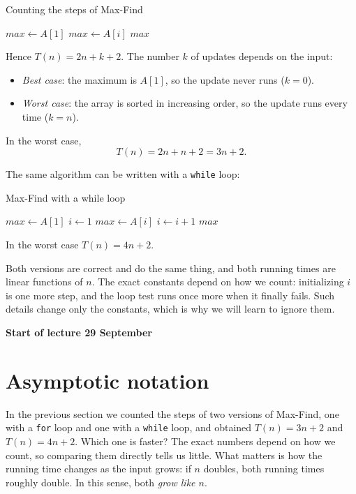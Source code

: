 \documentclass[a4paper,12pt,oneside]{report}
\newcommand{\lecturebanner}[1]{%
  \Needspace{6\baselineskip}%
  \begin{tcolorbox}[colback=yellow!20,colframe=yellow!60!black,
    boxrule=0.4pt,arc=1mm,left=5pt,right=5pt,top=3pt,bottom=3pt,
    before skip=6pt,after skip=6pt]
  \small\textbf{#1}
  \end{tcolorbox}}
\newcommand{\lecturestart}[1]{\lecturebanner{Start of lecture #1}}
\begin{document}
\begin{framedexample}{Counting the steps of Max-Find}
\label{ex:max-find-steps}
\begin{algorithmic}
  \State $\mathit{max}\gets A[1]$ 
   
     
      \State $\mathit{max}\gets A[i]$ 
    \EndIf
  \EndFor
  \State \Return $\mathit{max}$ 
\end{algorithmic}
Hence $T(n)=2n+k+2$. The number $k$ of updates depends on the input:
\begin{itemize}
  \item \emph{Best case}: the maximum is $A[1]$, so the update never
    runs ($k=0$).
  \item \emph{Worst case}: the array is sorted in increasing order, so
    the update runs every time ($k=n$).
\end{itemize}
In the worst case,
\[
  T(n)=2n+n+2=3n+2.
\]
\end{framedexample}

The same algorithm can be written with a \texttt{while} loop:

\begin{framedexample}{Max-Find with a while loop}\label{ex:max-find-while}
\begin{algorithmic}
  \State $\mathit{max}\gets A[1]$ 
  \State $i\gets1$
   
     
      \State $\mathit{max}\gets A[i]$ 
    \EndIf
    \State $i\gets i+1$ 
  \EndWhile
  \State \Return $\mathit{max}$ 
\end{algorithmic}
In the worst case $T(n)=4n+2$.
\end{framedexample}

Both versions are correct and do the same thing, and both running
times are linear functions of $n$. The exact constants depend on how we
count: initializing $i$ is one more step, and the loop test runs once
more when it finally fails. Such details change only the constants,
which is why we will learn to ignore them.

\lecturestart{29 September}

\section{Asymptotic notation}

In the previous section we counted the steps of two versions of
Max-Find, one with a \texttt{for} loop and one with a \texttt{while}
loop, and obtained $T(n)=3n+2$ and $T(n)=4n+2$. Which one is faster?
The exact numbers depend on how we count, so comparing them directly
tells us little. What matters is how the running time changes as the
input grows: if $n$ doubles, both running times roughly double. In this
sense, both \emph{grow like $n$}.
\end{document}
